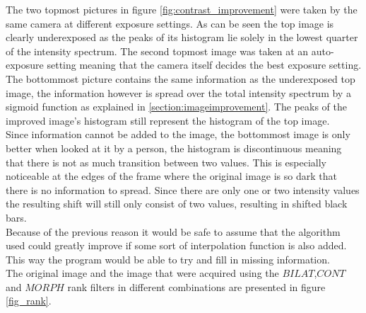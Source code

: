The two topmost pictures in figure \ref{fig:contrast_improvement} were taken by the same camera at different exposure settings. As can be seen the top image is clearly underexposed as the peaks of its histogram lie solely in the lowest quarter of the intensity spectrum. The second topmost image was taken at an auto-exposure setting meaning that the camera itself decides the best exposure setting. The bottommost picture contains the same information as the underexposed top image, the information however is spread over the total intensity spectrum by a sigmoid function as explained in \ref{section:imageimprovement}. The peaks of the improved image's histogram still represent the histogram of the top image.\\
Since information cannot be added to the image, the bottommost image is only better when looked at it by a person, the histogram is discontinuous meaning that there is not as much transition between two values. This is especially noticeable at the edges of the frame where the original image is so dark that there is no information to spread. Since there are only one or two intensity values the resulting shift will still only consist of two values, resulting in shifted black bars.\\
Because of the previous reason it would be safe to assume that the algorithm used could greatly improve if some sort of interpolation function is also added. This way the program would be able to try and fill in missing information.\\

The original image and the image that were acquired using the $BILAT$,$CONT$ and $MORPH$ rank filters in different combinations are presented in figure \ref{fig_rank}.

